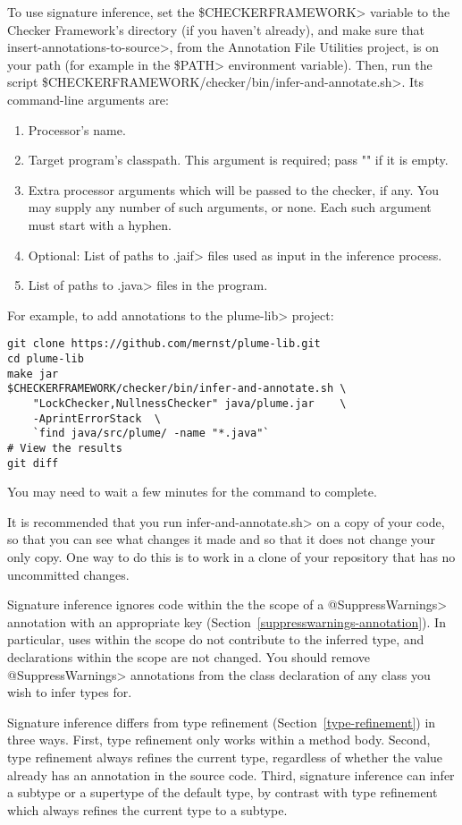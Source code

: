 To use signature inference,
set the \<\$CHECKERFRAMEWORK> variable to the Checker Framework's
directory (if you haven't already), and make sure that
\<insert-annotations-to-source>, from the Annotation File Utilities project,
is on your path (for example in the \<\$PATH> environment variable).
Then, run the script \<\$CHECKERFRAMEWORK/checker/bin/infer-and-annotate.sh>.
Its command-line arguments are:

\begin{enumerate}
\item Processor's name.
\item Target program's classpath.  This argument is required; pass "" if it
  is empty.
\item Extra processor arguments which will be passed to the checker, if any.
  You may supply any number of such arguments, or none.  Each such argument
  must start with a hyphen.
\item Optional: List of paths to \<.jaif> files used as input in the inference
    process.
\item List of paths to \<.java> files in the program.
\end{enumerate}

For example, to add annotations to the \<plume-lib> project:
\begin{Verbatim}
git clone https://github.com/mernst/plume-lib.git
cd plume-lib
make jar
$CHECKERFRAMEWORK/checker/bin/infer-and-annotate.sh \
    "LockChecker,NullnessChecker" java/plume.jar    \
    -AprintErrorStack  \
    `find java/src/plume/ -name "*.java"`
# View the results
git diff    
\end{Verbatim}

You may need to wait a few minutes for the command to complete.

It is recommended that you run \<infer-and-annotate.sh> on a copy of your
code, so that you can see what changes it made and so that it does not
change your only copy.  One way to do this is to work in a clone of your
repository that has no uncommitted changes.

Signature inference ignores code within the the scope of a
\<@SuppressWarnings> annotation with an appropriate key
(Section~\ref{suppresswarnings-annotation}).  In particular, uses within
the scope do not contribute to the inferred type, and declarations within
the scope are not changed.  You should remove \<@SuppressWarnings> annotations
from the class declaration of any class you wish to infer types for.

Signature inference differs from type refinement (Section~\ref{type-refinement})
in three ways.  First, type refinement only works within a method body.
Second, type refinement always
refines the current type, regardless of whether the value already has an
annotation in the source code.
Third, signature inference can infer a subtype
or a supertype of the default type, by contrast with type refinement which
always refines the current type to a subtype.


